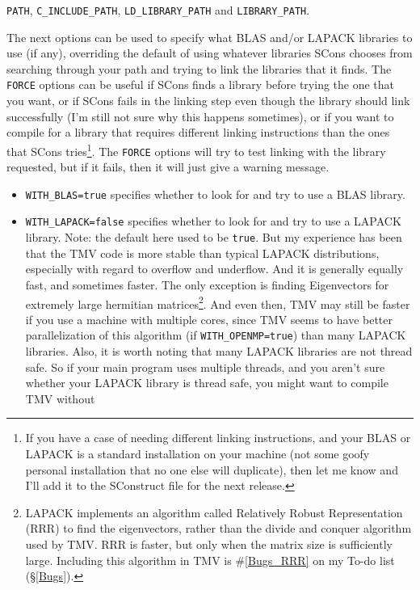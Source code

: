 \documentclass[twoside,letterpaper,11pt]{article}
\renewcommand{\tt}[1]{{\lstinline {#1}}}
\begin{document}
\begin{enumerate}
\begin{itemize}
\texttt{PATH}, \texttt{C\_INCLUDE\_PATH}, \texttt{LD\_LIBRARY\_PATH} and \texttt{LIBRARY\_PATH}.
\end{itemize}
The next options can be used to specify what BLAS and/or LAPACK libraries to use (if any),
overriding the default of using whatever libraries SCons chooses from searching through your path
and trying to link the libraries that it finds.  The \texttt{FORCE} options can be useful if SCons finds
a library before trying the one that you want, or if SCons fails in the linking step even though
the library should link successfully (I'm still not sure why this happens sometimes), or if
you want to compile for a library that requires different linking instructions than the 
ones that SCons tries\footnote{
If you have a case of needing different linking instructions, and your BLAS or LAPACK is a standard
installation on your machine (not some goofy personal installation that no one else will duplicate),
then let me know and I'll add it to the SConstruct file for the next release.}.
The \texttt{FORCE} options will try to test linking with the library requested,
but if it fails, then it will just give a warning message.
\begin{itemize}
\item \texttt{WITH\_BLAS=true} specifies whether to look for and try to use a BLAS library.
\item \texttt{WITH\_LAPACK=false} specifies whether to look for and try to use a LAPACK library.
Note: the default here used to be \tt{true}.  But my experience has been that the TMV code
is more stable than typical LAPACK distributions, especially with regard to overflow and 
underflow.  And it is generally equally fast, and sometimes faster.  The only exception is 
finding Eigenvectors for extremely large hermitian matrices\footnote{
LAPACK implements an algorithm called Relatively Robust Representation (RRR) to 
find the eigenvectors, rather than the divide and conquer algorithm used by TMV.
RRR is faster, but only when the matrix size is sufficiently large.  Including this algorithm 
in TMV is \#\ref{Bugs_RRR} on my To-do list (\S\ref{Bugs}).
}.  And even then, TMV may still be faster 
if you use a machine with multiple 
cores, since TMV seems to have better parallelization of this algorithm
 (if \tt{WITH_OPENMP=true}) than many LAPACK libraries.
Also, it is worth noting that many LAPACK libraries are not thread safe.
So if your main program uses multiple threads, and you aren't sure whether
your LAPACK library is thread safe, you might want to compile TMV without 

\end{itemize}
\end{enumerate}
\end{document}

